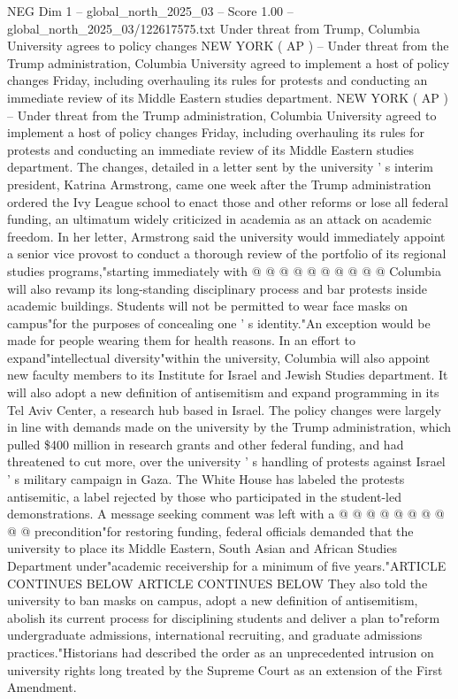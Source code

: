 \begin{textsample}{NEG Dim 1 – global\_north\_2025\_03 – Score 1.00 – global\_north\_2025\_03/122617575.txt}  \label{ex:f1_neg_057}
Under threat from Trump, Columbia University agrees to policy changes NEW YORK ( AP ) -- Under threat from the Trump administration, Columbia University agreed to implement a host of policy changes Friday, including overhauling its rules for protests and conducting an immediate review of its Middle Eastern studies department.
NEW YORK ( AP ) -- Under threat from the Trump administration, Columbia University agreed to implement a host of policy changes Friday, including overhauling its rules for protests and conducting an immediate review of its Middle Eastern studies department.
The changes, detailed in a letter sent by the university ' s interim president, Katrina Armstrong, came one week after the Trump administration ordered the Ivy League school to enact those and other reforms or lose all federal funding, an ultimatum widely criticized in academia as an attack on academic freedom.
In her letter, Armstrong said the university would immediately appoint a senior vice provost to conduct a thorough review of the portfolio of its regional studies programs,"starting immediately with @ @ @ @ @ @ @ @ @ @ Columbia will also revamp its long-standing disciplinary process and bar protests inside academic buildings.
Students will not be permitted to wear face masks on campus"for the purposes of concealing one ' s identity."An exception would be made for people wearing them for health reasons.
In an effort to expand"intellectual diversity"within the university, Columbia will also appoint new faculty members to its Institute for Israel and Jewish Studies department.
It will also adopt a new definition of antisemitism and expand programming in its Tel Aviv Center, a research hub based in Israel.
The policy changes were largely in line with demands made on the university by the Trump administration, which pulled \$400 million in research grants and other federal funding, and had threatened to cut more, over the university ' s handling of protests against Israel ' s military campaign in Gaza.
The White House has labeled the protests antisemitic, a label rejected by those who participated in the student-led demonstrations.
A message seeking comment was left with a @ @ @ @ @ @ @ @ @ @ precondition"for restoring funding, federal officials demanded that the university to place its Middle Eastern, South Asian and African Studies Department under"academic receivership for a minimum of five years."ARTICLE CONTINUES BELOW ARTICLE CONTINUES BELOW They also told the university to ban masks on campus, adopt a new definition of antisemitism, abolish its current process for disciplining students and deliver a plan to"reform undergraduate admissions, international recruiting, and graduate admissions practices."Historians had described the order as an unprecedented intrusion on university rights long treated by the Supreme Court as an extension of the First Amendment.

\end{textsample}
